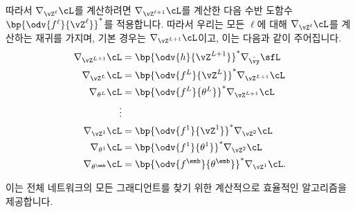 \documentclass[../../book-main_ko.tex]{subfiles}
\begin{document}
따라서 \(\nabla_{\vZ^{\ell}}\cL\)를 계산하려면 \(\nabla_{\vZ^{\ell + 1}}\cL\)를 계산한 다음 수반 도함수 \(\bp{\odv{f^{\ell}}{\vZ^{\ell}}}^{*}\)를 적용합니다. 따라서 우리는 모든 \(\ell\)에 대해 \(\nabla_{\vZ^{\ell}}\cL\)를 계산하는 재귀를 가지며, 기본 경우는 \(\nabla_{\vZ^{L + 1}}\cL\)이고, 이는 다음과 같이 주어집니다.
\begin{align}
    \nabla_{\vZ^{L + 1}}\cL
    &= \bp{\odv{h}{\vZ^{L + 1}}}^{*}\nabla_{\hat{\vy}}\sfL \\
    \nabla_{\vZ^{L}}\cL
    &= \bp{\odv{f^{L}}{\vZ^{L}}}^{*}\nabla_{\vZ^{L + 1}}\cL \\
    \nabla_{\theta^{L}}\cL
    &= \bp{\odv{f^{L}}{\theta^{L}}}^{*}\nabla_{\vZ^{L + 1}}\cL \\
    \vdots &  \\
    \nabla_{\vZ^{1}}\cL
    &= \bp{\odv{f^{1}}{\vZ^{1}}}^{*}\nabla_{\vZ^{2}}\cL \\
    \nabla_{\theta^{1}}\cL
    &= \bp{\odv{f^{1}}{\theta^{1}}}^{*}\nabla_{\vZ^{2}}\cL \\
    \nabla_{\theta^{\emb}}\cL
    &= \bp{\odv{f^{\emb}}{\theta^{\emb}}}^{*}\nabla_{\vZ^{1}}\cL.
\end{align}

이는 전체 네트워크의 모든 그래디언트를 찾기 위한 계산적으로 효율적인 알고리즘을 제공합니다.
\end{document}

